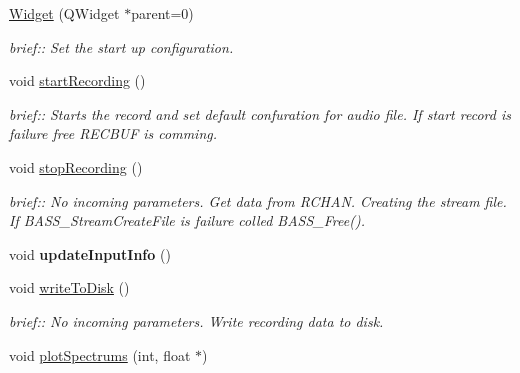 \begin{DoxyCompactItemize}
\item 
\hypertarget{classWidget_a29531c7f141e461322981b3b579d4590}{}\hyperlink{classWidget_a29531c7f141e461322981b3b579d4590}{Widget} (Q\+Widget $\ast$parent=0)\label{classWidget_a29531c7f141e461322981b3b579d4590}

\begin{DoxyCompactList}\small\item\em brief\+:\+: Set the start up configuration. \end{DoxyCompactList}\item 
\hypertarget{classWidget_a506b8a4ce5b5f0b1b652f17a0d6be960}{}void \hyperlink{classWidget_a506b8a4ce5b5f0b1b652f17a0d6be960}{start\+Recording} ()\label{classWidget_a506b8a4ce5b5f0b1b652f17a0d6be960}

\begin{DoxyCompactList}\small\item\em brief\+:\+: Starts the record and set default confuration for audio file. If start record is failure free R\+E\+C\+B\+U\+F is comming. \end{DoxyCompactList}\item 
\hypertarget{classWidget_aa230d039c1746fbc0d13159b6ac0b80e}{}void \hyperlink{classWidget_aa230d039c1746fbc0d13159b6ac0b80e}{stop\+Recording} ()\label{classWidget_aa230d039c1746fbc0d13159b6ac0b80e}

\begin{DoxyCompactList}\small\item\em brief\+:\+: No incoming parameters. Get data from R\+C\+H\+A\+N. Creating the stream file. If B\+A\+S\+S\+\_\+\+Stream\+Create\+File is failure colled B\+A\+S\+S\+\_\+\+Free(). \end{DoxyCompactList}\item 
\hypertarget{classWidget_a084296318fecbd86f48296d3010b0293}{}void {\bfseries update\+Input\+Info} ()\label{classWidget_a084296318fecbd86f48296d3010b0293}

\item 
\hypertarget{classWidget_aaf7b3689efa3f4b44af59bd9d514ff94}{}void \hyperlink{classWidget_aaf7b3689efa3f4b44af59bd9d514ff94}{write\+To\+Disk} ()\label{classWidget_aaf7b3689efa3f4b44af59bd9d514ff94}

\begin{DoxyCompactList}\small\item\em brief\+:\+: No incoming parameters. Write recording data to disk. \end{DoxyCompactList}\item 
\hypertarget{classWidget_ac924875bf37e21593ee688f588523a28}{}void \hyperlink{classWidget_ac924875bf37e21593ee688f588523a28}{plot\+Spectrums} (int, float $\ast$)\label{classWidget_ac924875bf37e21593ee688f588523a28}


\end{DoxyCompactItemize}
